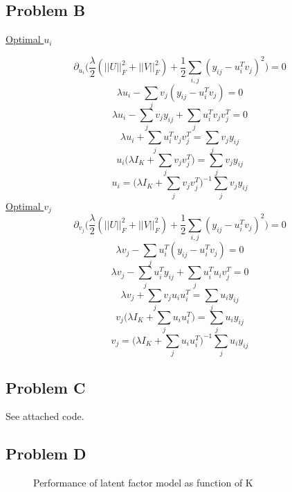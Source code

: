 \documentclass[12pt]{article} %
\begin{document}
\subsection{Problem B}

\underline{Optimal $u_i$}

$$\partial_{u_i}\bigg(\frac{\lambda}{2}(||U||_F^2 + ||V||_F^2) + \frac{1}{2}\sum_{i, j} (y_{ij} - u_i^Tv_j)^2\bigg) = 0$$
$$\lambda u_i -\sum_{j} v_j(y_{ij} - u_i^Tv_j) = 0$$
$$\lambda u_i -\sum_{j} v_j y_{ij} + \sum_{j} u_i^Tv_j v_j^T = 0$$
$$\lambda u_i + \sum_{j} u_i^T v_j v_j^T= \sum_{j} v_j y_{ij}$$
$$u_i \bigg(\lambda I_K + \sum_{j} v_j v_j^T\bigg)= \sum_{j} v_j y_{ij}$$
$$u_i = \bigg(\lambda I_K + \sum_{j} v_j v_j^T\bigg)^{-1} \sum_{j} v_j y_{ij}$$
\underline{Optimal $v_j$}
$$\partial_{v_j}\bigg(\frac{\lambda}{2}(||U||_F^2 + ||V||_F^2) + \frac{1}{2}\sum_{i, j} (y_{ij} - u_i^Tv_j)^2\bigg) = 0$$
$$\lambda v_j -\sum_{j} u_i^T(y_{ij} - u_i^Tv_j) = 0$$
$$\lambda v_j -\sum_{j} u_i^T y_{ij} + \sum_{j} u_i^Tu_i v_j^T = 0$$
$$\lambda v_j + \sum_{j} v_j u_i u_i^T= \sum_{j} u_i y_{ij}$$
$$v_j \bigg(\lambda I_K + \sum_{j} u_i u_i^T\bigg)= \sum_{j} u_i y_{ij}$$
$$v_j = \bigg(\lambda I_K + \sum_{j} u_i u_i^T\bigg)^{-1} \sum_{j} u_i y_{ij}$$


\subsection{Problem C}
See attached code.

\subsection{Problem D}

\begin{figure}[H]
	\vspace{-10mm}
	\caption{Performance of latent factor model as function of K}
\end{figure}
\end{document}
